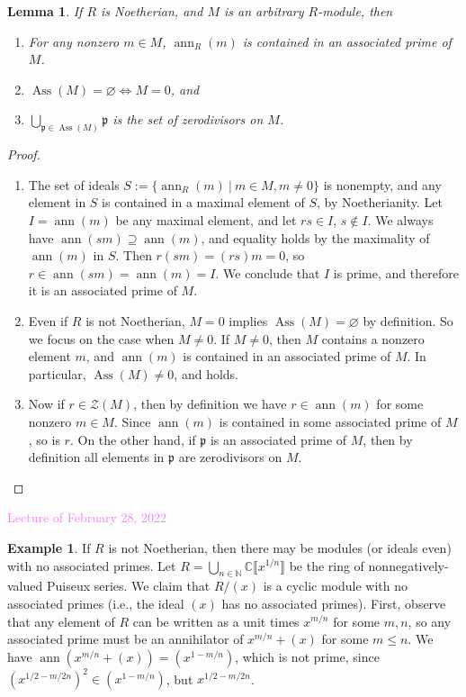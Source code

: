 \documentclass{amsart}[12pt]
\def\Ass{\operatorname{Ass}}
\def\ann{\operatorname{ann}}
\newcommand{\Feb}[1]{\textcolor{violet}{Lecture of February #1, 2022}}
\newcommand{\CC}{\mathbb{C}}
\newcommand{\ZZ}{\mathbb{Z}}
\newcommand{\NN}{\mathbb{N}}
\newcommand{\p}{{\mathfrak p}}
\numberwithin{equation}{section}
\theoremstyle{plain} %
\newtheorem{lemma}[equation]{Lemma}
\theoremstyle{definition}
\newtheorem{example}[equation]{Example}
\theoremstyle{remark}
\begin{document}
\begin{lemma}\label{associated primes nonzero}\label{zerodivisors associated primes}
	If $R$ is Noetherian, and $M$ is an arbitrary $R$-module, then 
	\begin{enumerate}
		\item For any nonzero $m \in M$, $\ann_R(m)$ is contained in an associated prime of $M$.
		\item $\Ass(M)= \varnothing \Longleftrightarrow M=0$, and
		\item $\bigcup\limits_{\p \in \Ass(M)} \p$ is the set of zerodivisors on $M$.
	\end{enumerate}
\end{lemma}
\begin{proof}
\begin{enumerate}
\item  The set of ideals $S := \{ \ann_R(m) \ | \ m\in M, m \neq 0\}$ is nonempty, and any element in $S$ is contained in a maximal element of $S$, by Noetherianity. Let $I=\ann(m)$ be any maximal element, and let $rs\in I$, $s\notin I$. We always have $\ann(sm)\supseteq \ann(m)$, and equality holds by the maximality of $\ann(m)$ in $S$. Then $r(sm)=(rs)m=0$, so $r\in \ann(sm)=\ann(m)=I$. We conclude that $I$ is prime, and therefore it is an associated prime of $M$.

\item	Even if $R$ is not Noetherian, $M = 0$ implies $\Ass(M) = \varnothing$ by definition. So we focus on the case when $M \neq 0$.
	 If $M \neq 0$, then $M$ contains a nonzero element $m$, and $\ann(m)$ is contained in an associated prime of $M$. In particular, $\Ass(M) \neq 0$, and holds. 
	 
\item Now if $r \in \mathcal{Z}(M)$, then by definition we have $r \in \ann(m)$ for some nonzero $m \in M$. Since $\ann(m)$ is contained in some associated prime of $M$, so is $r$. On the other hand, if $\p$ is an associated prime of $M$, then by definition all elements in $\p$ are zerodivisors on $M$.\qedhere
\end{enumerate}
\end{proof}

\Feb{28}

\begin{example}
	If $R$ is not Noetherian, then there may be modules (or ideals even) with no associated primes. Let $R=\bigcup_{n\in \NN} \CC\llbracket x^{1/n} \rrbracket$ be the ring of nonnegatively-valued Puiseux series. We claim that $R/(x)$ is a cyclic module with no associated primes (i.e., the ideal $(x)$ has no associated primes). First, observe that any element of $R$ can be written as a unit times $x^{m/n}$ for some $m,n$, so any associated prime must be an annihilator of $x^{m/n}+(x)$ for some $m\leq n$. We have $\ann(x^{m/n}+(x))=(x^{1-m/n})$, which is not prime, since $(x^{1/2-m/2n})^2 \in (x^{1-m/n})$, but $x^{1/2-m/2n}$.
\end{example}
\end{document}
